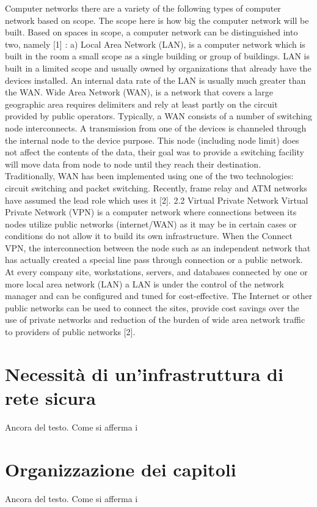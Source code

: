 Computer networks there are a variety of the following types of computer network based on scope. The scope here is how big the computer network will be built. Based on spaces in scope, a computer network can be distinguished into two, namely [1] : a) Local Area Network (LAN), is a computer network which is built in the room a small scope as a single building or group of buildings. LAN is built in a limited scope and usually owned by organizations that already have the devices installed. An internal data rate of the LAN is usually much greater than the WAN. Wide Area Network (WAN), is a network that covers a large geographic area requires delimiters and rely at least partly on the circuit provided by public operators. Typically, a WAN consists of a number of switching node interconnects. A transmission from one of the devices is channeled through the internal node to the device purpose. This node (including node limit) does not affect the contents of the data, their goal was to
provide a switching facility will move data from node to node until they reach their destination. Traditionally, WAN has been implemented using one of the two technologies: circuit switching and packet switching. Recently, frame relay and ATM networks have assumed the lead role which uses it [2].
2.2 Virtual Private Network
Virtual Private Network (VPN) is a computer network where connections between its nodes utilize public networks (internet/WAN) as it may be in certain cases or conditions do not allow it to build its own infrastructure. When the Connect VPN, the interconnection between the node such as an independent network that has actually created a special line pass through connection or a public network. At every company site, workstations, servers, and databases connected by one or more local area network (LAN) a LAN is under the control of the network manager and can be configured and tuned for cost-effective. The Internet or other public networks can be used to connect the sites, provide cost savings over the use of private networks and reduction of the burden of wide area network traffic to providers of public networks [2].

\section{Necessità di un'infrastruttura di rete sicura}

Ancora del testo. Come si afferma i
\section{Organizzazione dei capitoli}

Ancora del testo. Come si afferma i

